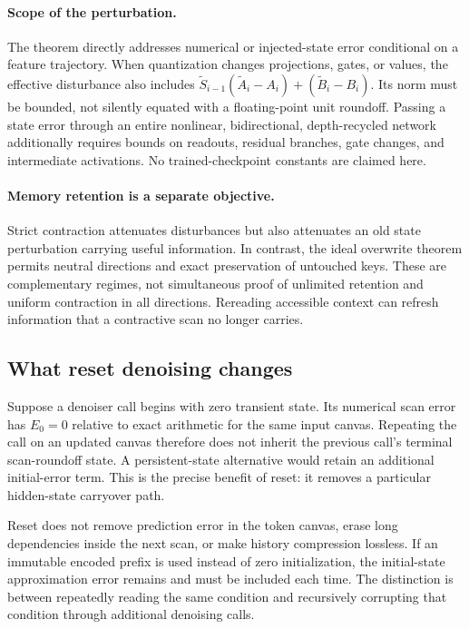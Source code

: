 \documentclass{article}
\theoremstyle{remark}\newtheorem{remark}[theorem]{Remark}
\begin{document}
\paragraph{Scope of the perturbation.}
The theorem directly addresses numerical or injected-state error conditional on a feature trajectory. When quantization changes projections, gates, or values, the effective disturbance also includes
$\widetilde S_{i-1}(\widetilde A_i-A_i)+(\widetilde B_i-B_i)$.
Its norm must be bounded, not silently equated with a floating-point unit roundoff. Passing a state error through an entire nonlinear, bidirectional, depth-recycled network additionally requires bounds on readouts, residual branches, gate changes, and intermediate activations. No trained-checkpoint constants are claimed here.

\paragraph{Memory retention is a separate objective.}
Strict contraction attenuates disturbances but also attenuates an old state perturbation carrying useful information. In contrast, the ideal overwrite theorem permits neutral directions and exact preservation of untouched keys. These are complementary regimes, not simultaneous proof of unlimited retention and uniform contraction in all directions. Rereading accessible context can refresh information that a contractive scan no longer carries.

\subsection{What reset denoising changes}
Suppose a denoiser call begins with zero transient state. Its numerical scan error has $E_0=0$ relative to exact arithmetic for the same input canvas. Repeating the call on an updated canvas therefore does not inherit the previous call's terminal scan-roundoff state. A persistent-state alternative would retain an additional initial-error term. This is the precise benefit of reset: it removes a particular hidden-state carryover path.

Reset does not remove prediction error in the token canvas, erase long dependencies inside the next scan, or make history compression lossless. If an immutable encoded prefix is used instead of zero initialization, the initial-state approximation error remains and must be included each time. The distinction is between repeatedly reading the same condition and recursively corrupting that condition through additional denoising calls.
\end{document}

